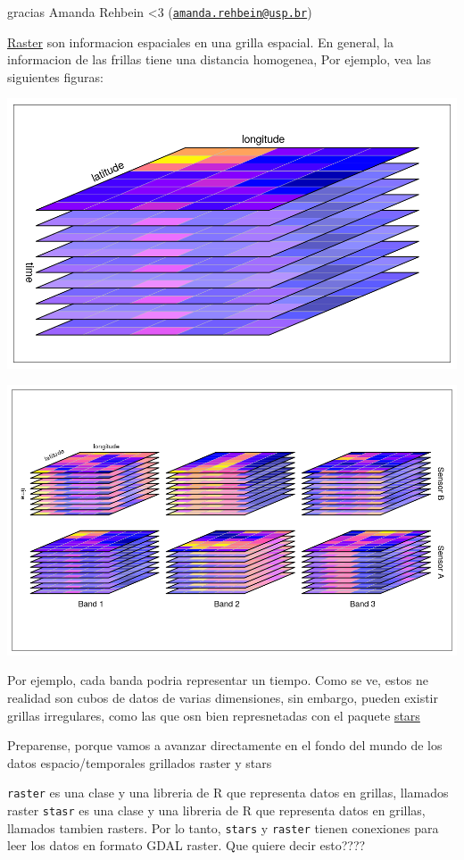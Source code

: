 \documentclass[]{book}
\begin{document}
gracias Amanda Rehbein \textless{}3 (\href{mailto:amanda.rehbein@usp.br}{\nolinkurl{amanda.rehbein@usp.br}})

\href{https://r-spatial.github.io/stars/}{Raster} son informacion espaciales en una grilla espacial. En general, la informacion de las frillas tiene una distancia homogenea, Por ejemplo, vea las siguientes figuras:

\includegraphics{figs/cube1.png}

\includegraphics{figs/cube2.png}

Por ejemplo, cada banda podria representar un tiempo. Como se ve, estos ne realidad son cubos de datos de varias dimensiones, sin embargo, pueden existir grillas irregulares, como las que osn bien represnetadas con el paquete \href{https://r-spatial.github.io/stars/articles/stars4.html}{stars}

Preparense, porque vamos a avanzar directamente en el fondo del mundo de los datos espacio/temporales grillados raster y stars

\texttt{raster} es una clase y una libreria de R que representa datos en grillas, llamados raster
\texttt{stasr} es una clase y una libreria de R que representa datos en grillas, llamados tambien rasters.
Por lo tanto, \texttt{stars} y \texttt{raster} tienen conexiones para leer los datos en formato GDAL raster. Que quiere decir esto????
\end{document}
